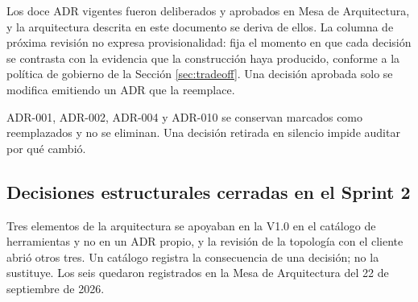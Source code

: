 \documentclass[11pt,a4paper]{article}
\begin{document}
\noindent Los doce ADR vigentes fueron deliberados y aprobados en Mesa de Arquitectura, y la arquitectura descrita en este documento se deriva de ellos. La columna de próxima revisión no expresa provisionalidad: fija el momento en que cada decisión se contrasta con la evidencia que la construcción haya producido, conforme a la política de gobierno de la Sección \ref{sec:tradeoff}. Una decisión aprobada solo se modifica emitiendo un ADR que la reemplace.

ADR-001, ADR-002, ADR-004 y ADR-010 se conservan marcados como reemplazados y no se eliminan. Una decisión retirada en silencio impide auditar por qué cambió.

\subsection{Decisiones estructurales cerradas en el Sprint 2}

Tres elementos de la arquitectura se apoyaban en la V1.0 en el catálogo de herramientas y no en un ADR propio, y la revisión de la topología con el cliente abrió otros tres. Un catálogo registra la consecuencia de una decisión; no la sustituye. Los seis quedaron registrados en la Mesa de Arquitectura del 22 de septiembre de 2026.
\end{document}
